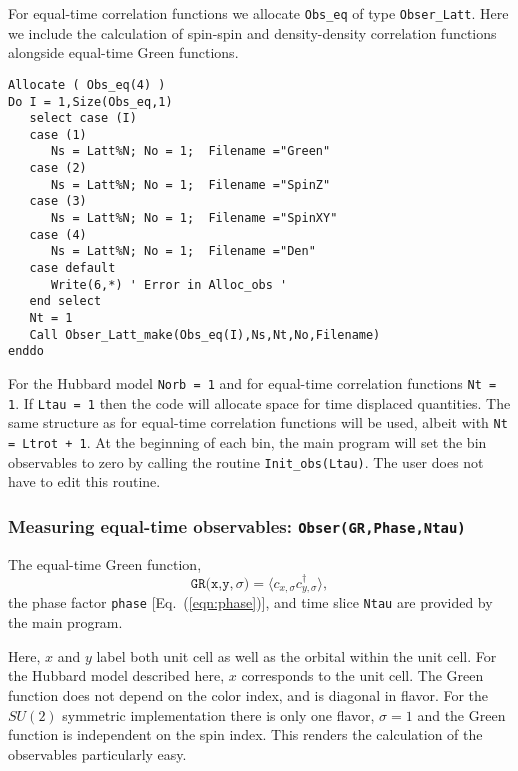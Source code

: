 For equal-time correlation functions  we allocate  \texttt{Obs\_eq}  of type \texttt{Obser\_Latt}.  Here we include the calculation of spin-spin and density-density correlation functions alongside equal-time Green functions. 
\begin{lstlisting}[style=fortran]
Allocate ( Obs_eq(4) )
Do I = 1,Size(Obs_eq,1)
   select case (I)
   case (1)
      Ns = Latt%N; No = 1;  Filename ="Green"
   case (2)
      Ns = Latt%N; No = 1;  Filename ="SpinZ"
   case (3)
      Ns = Latt%N; No = 1;  Filename ="SpinXY"
   case (4)
      Ns = Latt%N; No = 1;  Filename ="Den"
   case default
      Write(6,*) ' Error in Alloc_obs '  
   end select
   Nt = 1
   Call Obser_Latt_make(Obs_eq(I),Ns,Nt,No,Filename)
enddo
\end{lstlisting} 
 For the Hubbard model \texttt{Norb = 1} and for   equal-time correlation functions   \texttt{Nt = 1}.       If  \texttt{Ltau = 1}  then the code will allocate space for  time displaced quantities.   The same structure as for  equal-time correlation functions will be used, albeit with  \texttt{Nt = Ltrot + 1}.  At the beginning of each bin, the main program will set the bin observables to zero by calling  the routine 
 \texttt{Init\_obs(Ltau)}.   The user does not have to edit this routine. 
 
\subsubsection{Measuring equal-time observables: \texttt{Obser(GR,Phase,Ntau)}}

The equal-time  Green function,
\begin{equation}
	 \texttt{GR(x,y},\sigma{\texttt)}  = \langle c^{\phantom{\dagger}}_{x,\sigma} c^{\dagger}_{y,\sigma}  \rangle,
\end{equation}
the  phase factor \texttt{phase} [Eq.~(\ref{eqn:phase})], and time slice \texttt{Ntau}   are provided by the main program.  

Here,   $x$ and $y$ label  both unit cell as well as the orbital within the unit cell. For the Hubbard model described here, $x$ corresponds to the unit cell.  The Green function  does not depend on the color index, and is diagonal in flavor.  For the $SU(2)$ symmetric implementation  there is only one flavor, $\sigma = 1$ and the Green function is  independent on the spin index.  This renders the calculation of the observables particularly easy.   


